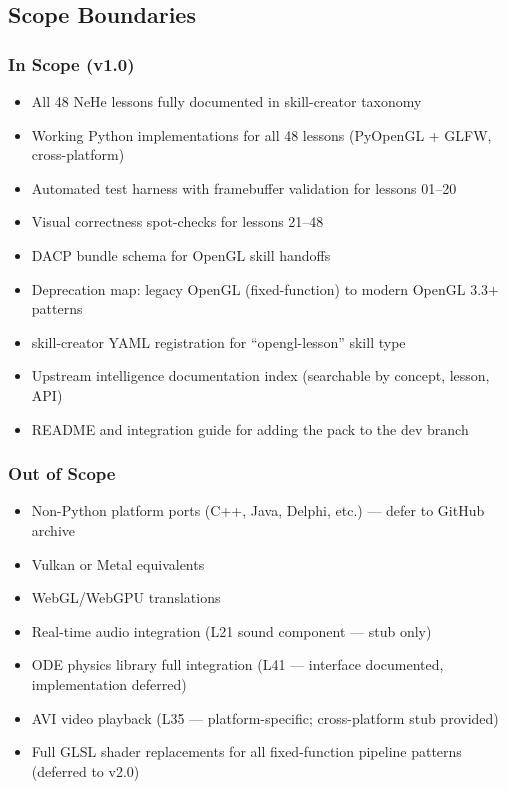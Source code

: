 \documentclass[11pt,letterpaper]{article}
\begin{document}
\subsection{Scope Boundaries}

\subsubsection{In Scope (v1.0)}

\begin{itemize}
\item All 48 NeHe lessons fully documented in skill-creator taxonomy
\item Working Python implementations for all 48 lessons (PyOpenGL + GLFW, cross-platform)
\item Automated test harness with framebuffer validation for lessons 01--20
\item Visual correctness spot-checks for lessons 21--48
\item DACP bundle schema for OpenGL skill handoffs
\item Deprecation map: legacy OpenGL (fixed-function) to modern OpenGL 3.3+ patterns
\item skill-creator YAML registration for ``opengl-lesson'' skill type
\item Upstream intelligence documentation index (searchable by concept, lesson, API)
\item README and integration guide for adding the pack to the dev branch
\end{itemize}

\subsubsection{Out of Scope}

\begin{itemize}
\item Non-Python platform ports (C++, Java, Delphi, etc.) --- defer to GitHub archive
\item Vulkan or Metal equivalents
\item WebGL/WebGPU translations
\item Real-time audio integration (L21 sound component --- stub only)
\item ODE physics library full integration (L41 --- interface documented, implementation deferred)
\item AVI video playback (L35 --- platform-specific; cross-platform stub provided)
\item Full GLSL shader replacements for all fixed-function pipeline patterns (deferred to v2.0)
\end{itemize}
\end{document}
